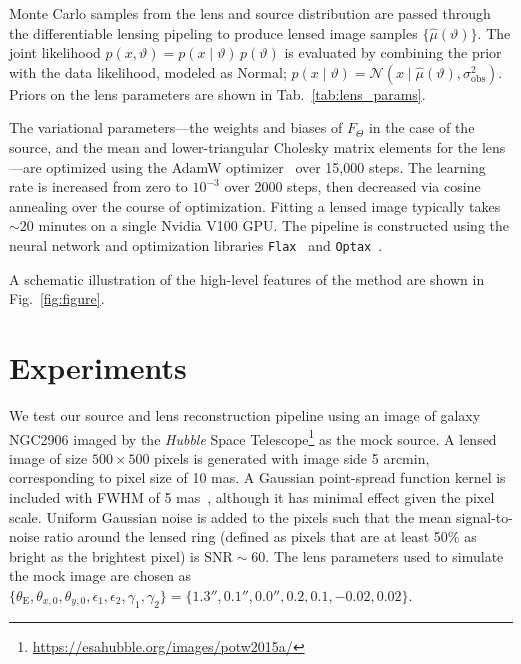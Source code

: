 \documentclass[nohyperref]{article}
\theoremstyle{plain}
\theoremstyle{definition}
\theoremstyle{remark}
\begin{document}
Monte Carlo samples from the lens and source distribution are passed through the differentiable lensing pipeling to produce lensed image samples $\{\hat\mu(\vartheta)\}$. The joint likelihood $p(x,\vartheta) = p(x\mid\vartheta)\,p(\vartheta)$ is evaluated by combining the prior with the data likelihood, modeled as Normal; $p(x\mid\vartheta) = \mathcal N\left(x\mid \hat\mu(\vartheta), \sigma_\mathrm{obs}^2\right)$. Priors on the lens parameters are shown in Tab.~\ref{tab:lens_params}.

The variational parameters---the weights and biases of  $F_\Theta$ in the case of the source, and the mean and lower-triangular Cholesky matrix elements for the lens---are optimized using the AdamW optimizer~\cite{kingma2014adam,loshchilov2017decoupled} over 15,000 steps. The learning rate is increased from zero to $10^{-3}$ over 2000 steps, then decreased via cosine annealing over the course of optimization. Fitting a lensed image typically takes $\sim 20$ minutes on a single Nvidia V100 GPU. The pipeline is constructed using the neural network and optimization libraries \texttt{Flax}~\citep{flax2020github} and \texttt{Optax}~\citep{optax2020github}.

A schematic illustration of the high-level features of the method are shown in Fig.~\ref{fig:figure}.

\section{Experiments}
\label{sec:experiments}

We test our source and lens reconstruction pipeline using an image of galaxy NGC2906 imaged by the \emph{Hubble} Space Telescope\footnote{\url{https://esahubble.org/images/potw2015a/}} as the mock source. A lensed image of size $500\times500$ pixels is generated with image side 5 arcmin, corresponding to pixel size of 10 mas. A Gaussian point-spread function kernel is included with FWHM of 5 mas~\cite{simon2019testing}, although it has minimal effect given the pixel scale.  Uniform Gaussian noise is added to the pixels such that the mean signal-to-noise ratio around the lensed ring (defined as pixels that are at least 50\% as bright as the brightest pixel) is $\mathrm{SNR}\sim 60$. The lens parameters used to simulate the mock image are chosen as $\{\theta_\mathrm{E}, \theta_{x,0}, \theta_{y,0}, \epsilon_1, \epsilon_2, \gamma_1, \gamma_2\} = \{1.3'', 0.1'', 0.0'', 0.2, 0.1, -0.02, 0.02\}$.
\end{document}
